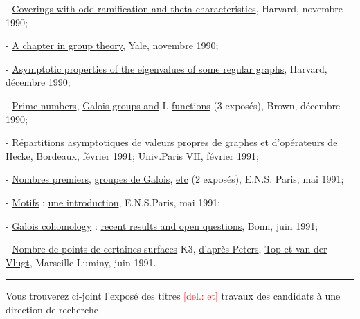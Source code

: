 \documentclass[11pt]{article}
\newcommand{\scanpage}[1]{\par\bigskip\noindent{\small\sffamily[scan #1]}\par}
\newcommand{\mspage}[1]{{\small\sffamily[p.\,#1]}}
\newcommand{\hand}[1]{\textcolor{blue}{#1}}
\newcommand{\deleted}[1]{\textcolor{red}{[\textsf{del.:} #1]}}
\newcommand{\uline}[1]{\underline{#1}}
\begin{document}
\mspage{\hand{300}}

\clearpage
\scanpage{119/301}
\mspage{- 14 -}

- \uline{Coverings with odd ramification and theta-characteristics}, Harvard,
novembre 1990;

- \uline{A chapter in group theory}, Yale, novembre 1990;

- \uline{Asymptotic properties of the eigenvalues of some regular graphs}, Harvard,
décembre 1990;

- \uline{Prime numbers}, \uline{Galois groups and} L-\uline{functions} (3 exposés), Brown, décembre
1990;

- \uline{Répartitions asymptotiques de valeurs propres de graphes et d'opérateurs}
\uline{de Hecke}, Bordeaux, février 1991; Univ.Paris VII, février 1991;

- \uline{Nombres premiers}, \uline{groupes de Galois}, \uline{etc} (2 exposés), E.N.S. Paris, mai
1991;

- \uline{Motifs} : \uline{une introduction}, E.N.S.Paris, mai 1991;

- \uline{Galois cohomology} : \uline{recent results and open questions}, Bonn, juin 1991;

- \uline{Nombre de points de certaines surfaces} K3, \uline{d'après Peters}, \uline{Top et van der}
\uline{Vlugt}, Marseille-Luminy, juin 1991.

\begin{center}\rule{4cm}{0.4pt}\end{center}

\mspage{\hand{301}}

\clearpage
\scanpage{119/303}
Vous trouverez ci-joint l'exposé
des titres \deleted{et} travaux des candidats
à une direction de recherche
\end{document}
